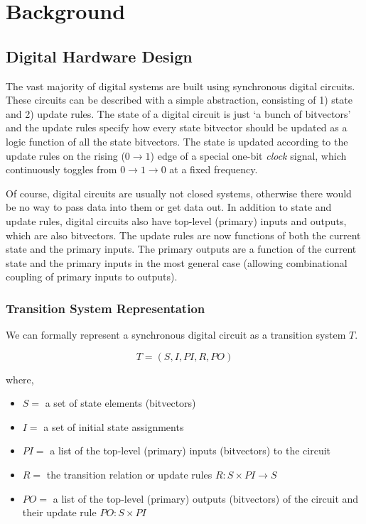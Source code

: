 \documentclass[sigconf,noacm]{acmart}
\begin{document}
\maketitle

\section{Background}

\subsection{Digital Hardware Design}

The vast majority of digital systems are built using synchronous digital circuits.
These circuits can be described with a simple abstraction, consisting of 1) state and 2) update rules.
The state of a digital circuit is just `a bunch of bitvectors' and the update rules specify how every state bitvector should be updated as a logic function of all the state bitvectors.
The state is updated according to the update rules on the rising ($0 \rightarrow 1$) edge of a special one-bit \textit{clock} signal, which continuously toggles from $0 \rightarrow 1 \rightarrow 0$ at a fixed frequency.

Of course, digital circuits are usually not closed systems, otherwise there would be no way to pass data into them or get data out.
In addition to state and update rules, digital circuits also have top-level (primary) inputs and outputs, which are also bitvectors.
The update rules are now functions of both the current state and the primary inputs.
The primary outputs are a function of the current state and the primary inputs in the most general case (allowing combinational coupling of primary inputs to outputs).

\subsubsection{Transition System Representation}
We can formally represent a synchronous digital circuit as a transition system $T$.

\begin{equation*}
  T = (S, I, PI, R, PO)
\end{equation*}

where,

\begin{itemize}
  \item $S = $ a set of state elements (bitvectors)
  \item $I = $ a set of initial state assignments
  \item $PI = $ a list of the top-level (primary) inputs (bitvectors) to the circuit
  \item $R = $ the transition relation or update rules $R: S \times PI \rightarrow S$
  \item $PO = $ a list of the top-level (primary) outputs (bitvectors) of the circuit and their update rule $PO: S \times PI$
\end{itemize}
\end{document}
